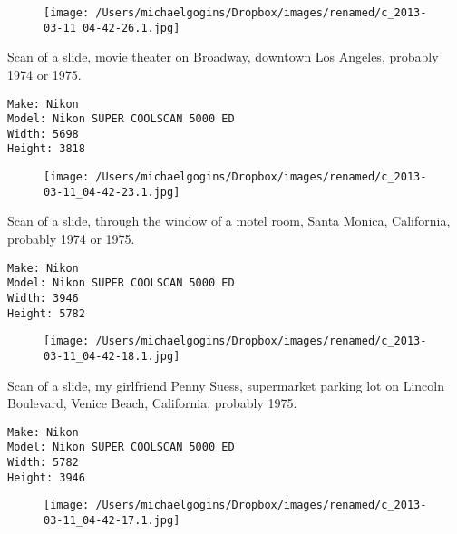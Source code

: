 \documentclass[11pt,letter,DIV=14,paper=landscape]{scrbook}
\begin{document}
\begin{figure}
\texttt{[image: /Users/michaelgogins/Dropbox/images/renamed/c\_2013-03-11\_04-42-26.1.jpg]}
\end{figure}
    
\clearpage
\noindent Scan of a slide, movie theater on Broadway, downtown Los Angeles, probably 1974 or 1975.
\noindent
\begin{lstlisting}
Make: Nikon
Model: Nikon SUPER COOLSCAN 5000 ED
Width: 5698
Height: 3818
\end{lstlisting}
\clearpage

\begin{figure}
\texttt{[image: /Users/michaelgogins/Dropbox/images/renamed/c\_2013-03-11\_04-42-23.1.jpg]}
\end{figure}
    
\clearpage
\noindent Scan of a slide, through the window of a motel room, Santa Monica, California, probably 1974 or 1975.
\noindent
\begin{lstlisting}
Make: Nikon
Model: Nikon SUPER COOLSCAN 5000 ED
Width: 3946
Height: 5782
\end{lstlisting}
\clearpage

\begin{figure}
\texttt{[image: /Users/michaelgogins/Dropbox/images/renamed/c\_2013-03-11\_04-42-18.1.jpg]}
\end{figure}
    
\clearpage
\noindent Scan of a slide, my girlfriend Penny Suess, supermarket parking lot on Lincoln Boulevard, Venice Beach, California, probably 1975.
\noindent
\begin{lstlisting}
Make: Nikon
Model: Nikon SUPER COOLSCAN 5000 ED
Width: 5782
Height: 3946
\end{lstlisting}
\clearpage

\begin{figure}
\texttt{[image: /Users/michaelgogins/Dropbox/images/renamed/c\_2013-03-11\_04-42-17.1.jpg]}
\end{figure}
    
\end{document}
